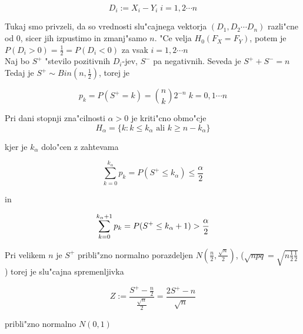 \documentclass[a4paper,12pt]{article}
\theoremstyle{definition}
\theoremstyle{remark}
\begin{document}
\begin{equation*}
    D_i := X_i - Y_i \; i = 1, 2 \cdots n
\end{equation*}

Tukaj smo privzeli, da so vrednosti slu"cajnega vektorja $(D_1, D_2 \cdots D_n)$ razli"cne od $0$, sicer jih izpustimo in
zmanj"samo $n$. "Ce velja $H_0(F_X = F_Y)$, potem je $P(D_i > 0) = \frac{1}{2} = P(D_i < 0)$ za vsak $i = 1, 2 \cdots n$ \\
Naj bo $S^+$ "stevilo pozitivnih $D_i$-jev, $S^-$ pa negativnih. Seveda je $S^+ + S^- = n$ \\
Tedaj je $S^+ \sim Bin(n, \frac{1}{2})$, torej je

\begin{equation*}
    p_k = P(S^+ = k) = \binom{n}{k} 2^{-n} \; k = 0, 1 \cdots n
\end{equation*}

Pri dani stopnji zna"cilnosti $\alpha > 0$ je kriti"cno obmo"cje 
\begin{equation*}
    H_{\alpha} = \{k: k \leq k_{\alpha} \text{ ali } k \geq n - k_{\alpha}\}
\end{equation*}

kjer je $k_{\alpha}$ dolo"cen z zahtevama

\begin{equation*}
    \sum_{k=0}^{k_{\alpha}} p_k = P(S^+ \leq k_{\alpha}) \leq \frac{\alpha}{2}
\end{equation*}

in %

\begin{equation*}
    \sum_{k=0}^{k_{\alpha} + 1} p_k = P(S^+ \leq k_{\alpha} + 1) > \frac{\alpha}{2} \\
\end{equation*}


Pri velikem $n$ je $S^+$ pribli"zno normalno porazdeljen $N(\frac{n}{2}, \frac{\sqrt{n}}{2})$, ($\sqrt{npq} =
\sqrt{n \frac{1}{2} \frac{1}{2}}$) torej je slu"cajna spremenljivka

\begin{equation*}
    Z := \frac{S^+ - \frac{n}{2}}{\frac{\sqrt{n}}{2}} = \frac{2S^+ - n}{\sqrt{n}}
\end{equation*}

pribli"zno normalno $N(0,1)$
\end{document}
